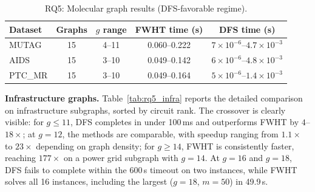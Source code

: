 \documentclass[acmsmall,review]{acmart}
\begin{document}
	\begin{table}[H]
		\centering
		\caption{RQ5: Molecular graph results (DFS-favorable regime).}
		\label{tab:rq5_molecular}
		\begin{tabular}{lcccc}
			\toprule
			Dataset & Graphs & $g$ range & FWHT time (s) & DFS time (s) \\
			\midrule
			MUTAG   & 15 & 4--11 & 0.060--0.222 & $7 \times 10^{-6}$--$4.7 \times 10^{-3}$ \\
			AIDS    & 15 & 3--10 & 0.049--0.142 & $6 \times 10^{-6}$--$4.8 \times 10^{-3}$ \\
			PTC\_MR & 15 & 3--10 & 0.049--0.164 & $5 \times 10^{-6}$--$1.4 \times 10^{-3}$ \\
			\bottomrule
		\end{tabular}
	\end{table}

	\textbf{Infrastructure graphs.} Table~\ref{tab:rq5_infra} reports the detailed comparison on infrastructure subgraphs, sorted by circuit rank. The crossover is clearly visible: for $g \le 11$, DFS completes in under 100\,ms and outperforms FWHT by $4$--$18\times$; at $g = 12$, the methods are comparable, with speedup ranging from $1.1\times$ to $23\times$ depending on graph density; for $g \ge 14$, FWHT is consistently faster, reaching $177\times$ on a power grid subgraph with $g = 14$. At $g = 16$ and $g = 18$, DFS fails to complete within the 600\,s timeout on two instances, while FWHT solves all 16 instances, including the largest ($g = 18$, $m = 50$) in 49.9\,s.
\end{document}
